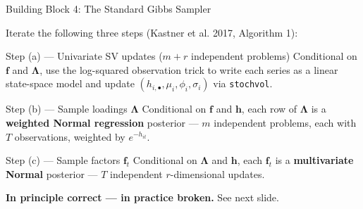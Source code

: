 \documentclass[10pt]{beamer}\usepackage[]{graphicx}\usepackage[table]{xcolor}
\begin{document}
\begin{frame}{Building Block 4: The Standard Gibbs Sampler}

  Iterate the following three steps (Kastner et al. 2017, Algorithm 1):

  \vspace{0.3em}

  \begin{alertblock}{Step (a) --- Univariate SV updates ($m+r$ independent problems)}
    Conditional on $\mathbf{f}$ and $\boldsymbol{\Lambda}$, use the
    log-squared observation trick to write each series as a linear
    state-space model and update $(h_{i,\bullet}, \mu_i, \phi_i, \sigma_i)$
    via \texttt{stochvol}.
  \end{alertblock}

  \begin{alertblock}{Step (b) --- Sample loadings $\boldsymbol{\Lambda}$}
    Conditional on $\mathbf{f}$ and $\mathbf{h}$, each row of
    $\boldsymbol{\Lambda}$ is a \textbf{weighted Normal regression} posterior
    --- $m$ independent problems, each with $T$ observations,
    weighted by $e^{-h_{it}}$.
  \end{alertblock}

  \begin{alertblock}{Step (c) --- Sample factors $\mathbf{f}_t$}
    Conditional on $\boldsymbol{\Lambda}$ and $\mathbf{h}$, each
    $\mathbf{f}_t$ is a \textbf{multivariate Normal} posterior ---
    $T$ independent $r$-dimensional updates.
  \end{alertblock}

  \vspace{0.3em}

  \textbf{In principle correct --- in practice broken.}  See next slide.

\end{frame}

\end{document}

